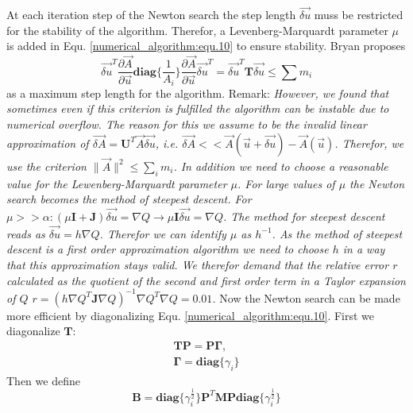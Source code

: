 At each iteration step of the Newton search the step length $\vec{\delta u}$ muss be restricted for the stability of the algorithm.
Therefor, a Levenberg-Marquardt parameter $\mu$ is added in Equ. \ref{numerical_algorithm:equ.10} to ensure stability.
Bryan proposes 
\begin{equation}
	\vec{\delta u}^T \frac{\partial \vec A}{\partial \vec u}\mathbf{diag}\{\frac{1}{A_i}\}\frac{\partial \vec A}{\partial \vec u}
	\vec{\delta u}^T = \vec{\delta u}^T \mathbf{T} \vec{\delta u} \leq \sum m_i
\end{equation}
as a maximum step length for the algorithm.\newline
Remark:\newline
\textit{However, we found that sometimes even if this criterion is fulfilled the algorithm can be instable due to numerical overflow. The reason for this we assume to be the invalid linear approximation of $\vec {\delta A} = \mathbf{U}^T \vec A\vec{\delta u}$, i.e. $\vec{\delta A} << \vec A(\vec u + \vec{\delta u}) - \vec A(\vec u)$. 
Therefor, we use the criterion $\parallel \vec A \parallel^2 \leq \sum_i m_i$. In addition we need to choose a reasonable value for the Lewenberg-Marquardt parameter $\mu$. For large values of $\mu$ the Newton search becomes the method of steepest descent. For $\mu >> \alpha: (\mu \mathbf{I} + \mathbf{J})\vec{\delta u} = \nabla Q \rightarrow \mu \mathbf{I} \vec{\delta u} = \nabla Q$. The method for steepest descent reads as $\vec{\delta u} = h \nabla Q$. Therefor we can identify $\mu$ as $h^{-1}$. As the method of steepest descent is a first order approximation algorithm we need to choose $h$ in a way that this approximation stays valid. We therefor demand that the relative error $r$ calculated as the quotient of the second and first order term in a Taylor expansion of $Q$ $r = (h\nabla Q^T \mathbf{J}\nabla Q)^{-1}\nabla Q^T\nabla Q = 0.01$.}\newline
Now the Newton search can be made more efficient by diagonalizing Equ. \ref{numerical_algorithm:equ.10}. First we diagonalize $\mathbf{T}$:
\begin{equation}
	\begin{gathered}
		\mathbf{T} \mathbf{P} = \mathbf{P} \mathbf{\Gamma},\\
		\mathbf{\Gamma} = \mathbf{diag} \{\gamma_i\}
	\end{gathered}
	\label{numerical_algorithm:equ.11}
\end{equation}
Then we define
\begin{equation}
	\mathbf{B} = \mathbf{diag} \{ \gamma_i^{\frac{1}{2}}\}\mathbf{P}^T \mathbf{M}\mathbf{P}\mathbf{diag}\{ \gamma_i^{\frac{1}{2}}\}
	\label{numerical_algorithm:equ.12}
\end{equation}

